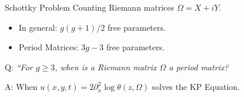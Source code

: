 \documentclass {beamer}
\begin{document}
\begin{frame}{Schottky Problem}{}
  Counting Riemann matrices $\Omega = X + iY$.
  \begin{itemize}
    \item In general: $g(g+1)/2$ free parameters.
    \item Period Matrices: $3g-3$ free parameters.
  \end{itemize}

  Q: {\it ``For $g \geq 3$, when is a Riemann matrix $\Omega$ a period
    matrix?}

  A: When $u(x,y,t) = 2 \partial^2_x \log \theta(z,\Omega)$ solves the
  KP Equation.
\end{frame}


\begin{frame}
\end{frame}
\end{document}
